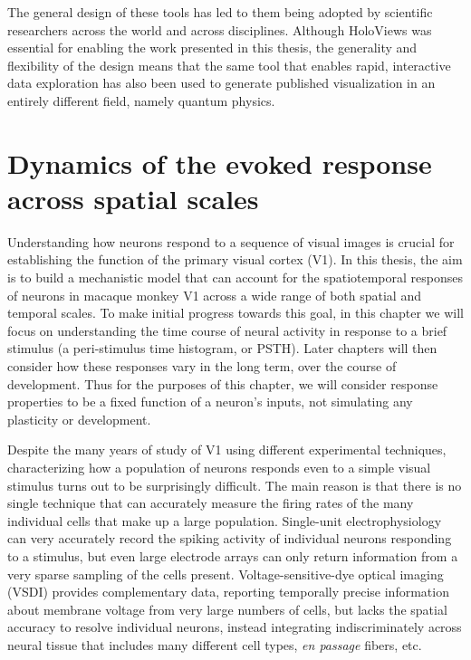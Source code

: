 \documentclass[phd,ianc,twoside]{infthesis}
\begin{document}
The general design of these tools has led to them being adopted by
scientific researchers across the world and across disciplines. Although
HoloViews was essential for enabling the work presented in this thesis,
the generality and flexibility of the design means that the same tool
that enables rapid, interactive data exploration has also been used to
generate published visualization in an entirely different field, namely
quantum physics.

\chapter{Dynamics of the evoked response across spatial scales}
\label{chapter:SIRD}

Understanding how neurons respond to a sequence of visual images is
crucial for establishing the function of the primary visual cortex
(V1). In this thesis, the aim is to build a mechanistic model that can
account for the spatiotemporal responses of neurons in macaque monkey
V1 across a wide range of both spatial and temporal scales. To make
initial progress towards this goal, in this chapter we will focus on
understanding the time course of neural activity in response to a
brief stimulus (a peri-stimulus time histogram, or PSTH).  Later
chapters will then consider how these responses vary in the long term,
over the course of development.  Thus for the purposes of this
chapter, we will consider response properties to be a fixed function
of a neuron's inputs, not simulating any plasticity or development.

Despite the many years of study of V1 using different experimental
techniques, characterizing how a population of neurons responds even
to a simple visual stimulus turns out to be surprisingly difficult.
The main reason is that there is no single technique that can
accurately measure the firing rates of the many individual cells that
make up a large population.  Single-unit electrophysiology can very
accurately record the spiking activity of individual neurons
responding to a stimulus, but even large electrode arrays can only
return information from a very sparse sampling of the cells present.
Voltage-sensitive-dye optical imaging (VSDI) provides complementary
data, reporting temporally precise information about membrane voltage
from very large numbers of cells, but lacks the spatial accuracy to
resolve individual neurons, instead integrating indiscriminately
across neural tissue that includes many different cell types, \emph{en
passage} fibers, etc.
\end{document}
